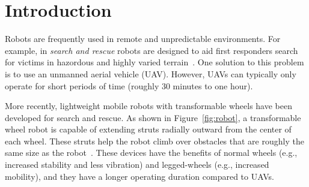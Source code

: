 \section{Introduction}

Robots are frequently used in remote and unpredictable environments.
%
%
For example, in \emph{search and rescue} robots are designed to aid first responders search for victims in hazordous and highly varied terrain~\citep{Graf.2017.2ISSCIS.RescuePathOptimization}.
%
One solution to this problem is to use an unmanned aerial vehicle (UAV). However, UAVs can typically only operate for short periods of time (roughly 30 minutes to one hour).

More recently, lightweight mobile robots with transformable wheels have been developed for search and rescue.
%
As shown in Figure~\ref{fig:robot}, a transformable wheel robot is capable of extending struts radially outward from the center of each wheel. These struts help the robot climb over obstacles that are roughly the same size as the robot~\citep{Clark.2018.C.EvolvingControllersTransformable}.
%
These devices have the benefits of normal wheels (e.g., increased stability and less vibration) and legged-wheels (e.g., increased mobility), and they have a longer operating duration compared to UAVs.


